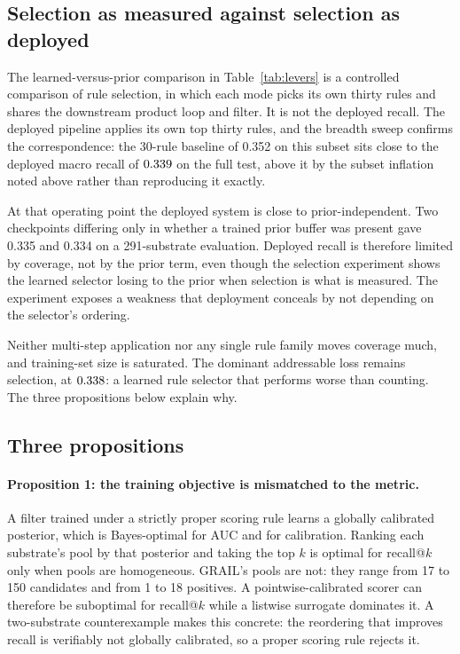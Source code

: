 \subsection{Selection as measured against selection as deployed}

The learned-versus-prior comparison in Table~\ref{tab:levers} is a controlled comparison of rule
selection, in which each mode picks its own thirty rules and shares the downstream product loop
and filter. It is not the deployed recall. The deployed pipeline applies its own top thirty
rules, and the breadth sweep confirms the correspondence: the 30-rule baseline of 0.352 on this
subset sits close to the deployed macro recall of $0.339$ on the full test, above it by the
subset inflation noted above rather than reproducing it exactly.

At that operating point the deployed system is close to prior-independent. Two checkpoints
differing only in whether a trained prior buffer was present gave 0.335 and 0.334 on a
291-substrate evaluation. Deployed recall is therefore limited by coverage, not by the
prior term, even though the selection experiment shows the learned selector losing to the prior
when selection is what is measured. The experiment exposes a weakness that deployment conceals
by not depending on the selector's ordering.

Neither multi-step application nor any single rule family moves coverage much, and training-set
size is saturated. The dominant addressable loss remains selection, at $0.338$: a learned rule
selector that performs worse than counting. The three propositions below explain why.

\subsection{Three propositions}

\paragraph{Proposition 1: the training objective is mismatched to the metric.}
A filter trained under a strictly proper scoring rule learns a globally calibrated posterior,
which is Bayes-optimal for AUC and for calibration. Ranking each substrate's pool by that
posterior and taking the top $k$ is optimal for recall@$k$ only when pools are homogeneous.
GRAIL's pools are not: they range from 17 to 150 candidates and from 1 to 18 positives. A
pointwise-calibrated scorer can therefore be suboptimal for recall@$k$ while a listwise
surrogate dominates it. A two-substrate counterexample makes this concrete: the reordering that
improves recall is verifiably not globally calibrated, so a proper scoring rule rejects it.

